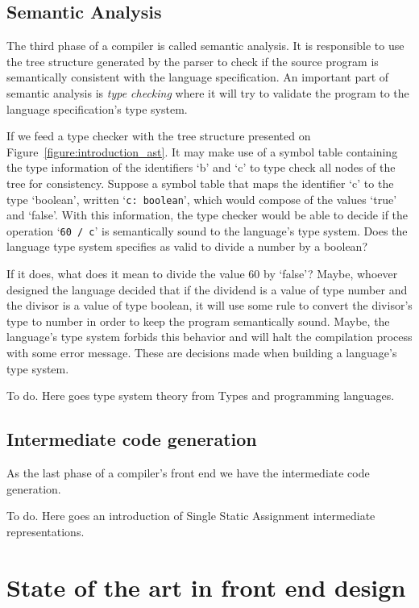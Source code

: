 \documentclass[
  oneside,
  english,
  coorientadorbanca,
  embeddedlogo,
  noabntexcite
]{ufsc-thesis-rn46-2019}
\begin{document}
\section{Semantic Analysis}\label{chapter:background:sec:semantic}

The third phase of a compiler is called semantic analysis.
It is responsible to use the tree structure generated by the parser to check if the source program is semantically consistent with the language specification.
An important part of semantic analysis is \textit{type checking} where it will try to validate the program to the language specification's type system.

If we feed a type checker with the tree structure presented on Figure~\ref{figure:introduction_ast}.
It may make use of a symbol table containing the type information of the identifiers `b' and `c' to type check all nodes of the tree for consistency.
Suppose a symbol table that maps the identifier `c' to the type `boolean', written `\verb+c: boolean+', which would compose of the values `true' and `false'.
With this information, the type checker would be able to decide if the operation `\verb+60 / c+' is semantically sound to the language's type system.
Does the language type system specifies as valid to divide a number by a boolean?

If it does, what does it mean to divide the value 60 by `false'?
Maybe, whoever designed the language decided that if the dividend is a value of type number and the divisor is a value of type boolean, it will use some rule to convert the divisor's type to number in order to keep the program semantically sound.
Maybe, the language's type system forbids this behavior and will halt the compilation process with some error message.
These are decisions made when building a language's type system.

To do. Here goes type system theory from Types and programming languages.

\section{Intermediate code generation}\label{chapter:background:sec:intermediate}

As the last phase of a compiler's front end we have the intermediate code generation.

To do. Here goes an introduction of Single Static Assignment intermediate representations.

\chapter{State of the art in front end design}\label{chapter:related_work}
\end{document}
